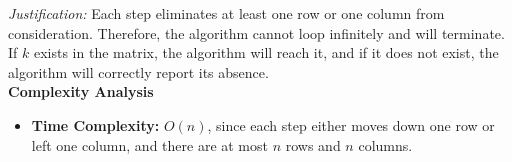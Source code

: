 \documentclass[12pt]{article}
\begin{document}
\begin{enumerate}
\emph{Justification:}  
Each step eliminates at least one row or one column from consideration. Therefore, the algorithm cannot loop infinitely and will terminate. If \(k\) exists in the matrix, the algorithm will reach it, and if it does not exist, the algorithm will correctly report its absence. \\


\textbf{Complexity Analysis}

\begin{itemize}
    \item \textbf{Time Complexity:} $O(n)$, since each step either moves down one row or left one column, and there are at most $n$ rows and $n$ columns.
\end{itemize}
\end{enumerate}
\end{document}
